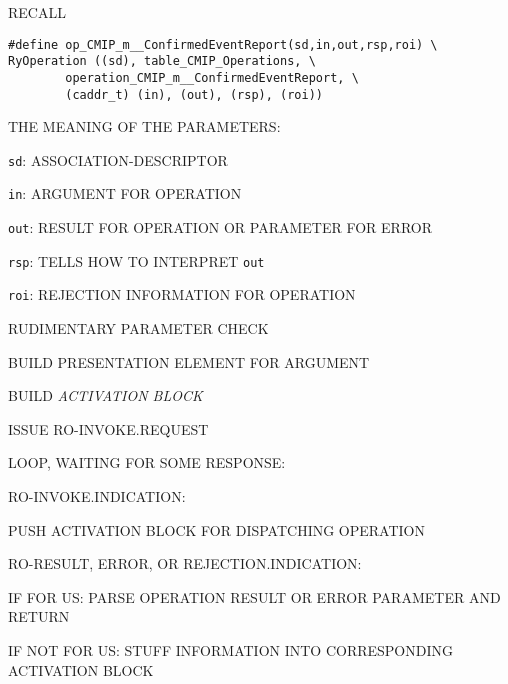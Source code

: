 \begin{bwslide}

\begin{nrtc}
\item	RECALL
\begin{verbatim}
#define op_CMIP_m__ConfirmedEventReport(sd,in,out,rsp,roi) \
RyOperation ((sd), table_CMIP_Operations, \
        operation_CMIP_m__ConfirmedEventReport, \
        (caddr_t) (in), (out), (rsp), (roi))
\end{verbatim}

\item	THE MEANING OF THE PARAMETERS:
    \begin{nrtc}
    \item	\verb"sd": ASSOCIATION-DESCRIPTOR

    \item	\verb"in": ARGUMENT FOR OPERATION

    \item	\verb"out": RESULT FOR OPERATION OR PARAMETER FOR ERROR

    \item	\verb"rsp": TELLS HOW TO INTERPRET \verb"out"

    \item	\verb"roi": REJECTION INFORMATION FOR OPERATION
    \end{nrtc}
\end{nrtc}
\end{bwslide}


\begin{bwslide}

\begin{nrtc}
\item	RUDIMENTARY PARAMETER CHECK

\item	BUILD PRESENTATION ELEMENT FOR ARGUMENT

\item	BUILD \emph{ACTIVATION BLOCK}

\item	ISSUE RO-INVOKE.REQUEST

\item	LOOP, WAITING FOR SOME RESPONSE:
    \begin{nrtc}
    \item	RO-INVOKE.INDICATION:
	\begin{nrtc}
	\item	 PUSH ACTIVATION BLOCK FOR DISPATCHING OPERATION
	\end{nrtc}

    \item	RO-RESULT, ERROR, OR REJECTION.INDICATION:
	\begin{nrtc}
	\item	IF FOR US: PARSE OPERATION RESULT OR ERROR PARAMETER AND RETURN

	\item	IF NOT FOR US: STUFF INFORMATION INTO CORRESPONDING ACTIVATION
		BLOCK
	\end{nrtc}
    \end{nrtc}
\end{nrtc}
\end{bwslide}



